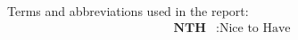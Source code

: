 
Terms and abbreviations used in the report:
\begin{align*}
    \textbf{NTH} &: \text{Nice to Have} \\
\end{align*}